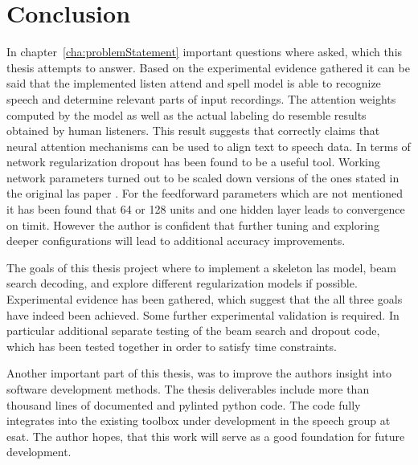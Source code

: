 \chapter{Conclusion}
In chapter~\ref{cha:problemStatement} important questions where asked, which this thesis attempts to answer.
Based on the experimental evidence gathered it can be said that the implemented listen attend and spell model is able to recognize speech and determine relevant parts of input recordings. The attention weights computed by the model as well as the actual labeling do resemble results obtained by human listeners. This result suggests that \cite{Chan2015} correctly claims that neural attention mechanisms can be used to align text to speech data. In terms of network regularization dropout \cite{Srivastava2014} has been found to be a useful tool. Working network parameters turned out to be scaled down versions of the ones stated in the original las paper \cite{Chan2015}. For the feedforward parameters which are not mentioned it has been found that 64 or 128 units and one hidden layer leads to convergence on timit. However the author is confident that further tuning and exploring deeper configurations will lead to additional accuracy improvements.

The goals of this thesis project where to implement a skeleton las model, beam search decoding, and explore different regularization models if possible.
Experimental evidence has been gathered, which suggest that the all three goals have indeed been achieved. Some further experimental validation is required. In particular additional separate testing of the beam search and dropout code, which has been tested together in order to satisfy time constraints. 

Another important part of this thesis, was to improve the authors insight into software development methods. The thesis deliverables include more than thousand lines of documented and pylinted python code. The code fully integrates into the existing toolbox under development in the speech group at esat. The author hopes, that this work will serve as a good foundation for future development.  